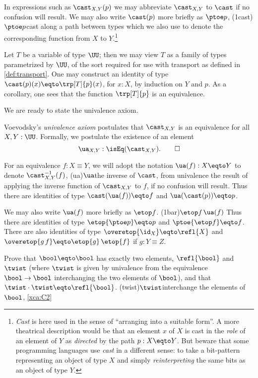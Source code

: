 In expressions such as $\cast_{X,Y}(p)$ we may abbreviate $\cast_{X,Y}$ to $\cast$ if
no confusion will result. We may also write $\cast (p)$ more briefly as $\ptoe p$,%
\glossary(1cast){$\protect\ptoe p$}{cast along a path between types}
which we also use to denote the corresponding function from $X$ to $Y$.\footnote{%
    \emph{Cast} is here used in the sense of ``arranging into a suitable form''.
    A more theatrical description would be that an element $x$ of $X$ is cast in the \emph{role} of an element of $Y$
    as \emph{directed} by the path $p : X \eqto Y$.
    But beware that some programming languages use \emph{cast} in a different sense:
    to take a bit-pattern representing an object of type $X$ and simply \emph{reinterpreting} the same bits as an object of type $Y$.}

Let $T$ be a variable of type $\UU$; then we may view $T$ as a family of types parametrized by $\UU$, of the sort required for use with
transport as defined in \cref{def:transport}.  One may construct an identity of type $\cast(p)(x) \eqto \trp[T]{p} (x)$, for $x : X$, by induction
on $Y$ and $p$.  As a corollary, one sees that the function $\trp[T]{p}$ is an equivalence.

We are ready to state the univalence axiom.

\begin{principle}\label{def:univalence}
    Voevodsky's \emph{univalence axiom} postulates that $\cast_{X,Y}$ is an equivalence for all $X,Y:\UU$.
    Formally, we postulate the existence of an element
    \[
      \ua_{X,Y} : \isEq(\cast_{X,Y}).\qedhere
    \]
\end{principle}

For an equivalence $f: X\equiv Y$, we will adopt the notation $\ua(f) : X \eqto Y $ to denote $\cast_{X,Y}^{-1}(f)$,%
\glossary(ua){$\protect\ua$}{the inverse of $\protect\cast$, from univalence}
the result of applying the
inverse function of $\cast_{X,Y}$ to $f$, if no confusion will result.  Thus there are identities of type $\cast (\ua (f)) \eqto f$ and $\ua (\cast (p)) \eqto p$.

We may also write $\ua (f)$ more briefly as $\etop f$.%
\glossary(1bar){$\protect\etop f$}{$\protect\ua(f)$}
Thus there are identities of type $\etop {\ptoe p} \eqto p$ and $\ptoe {\etop f} \eqto f$.  There are also identities of type $\overetop{\id_X} \eqto \refl{X}$
and $\overetop{g\,f} \eqto \etop{g}\,\etop{f}$ if $g: Y\equiv Z$.

\begin{xca}\label{xca:C2}
Prove that $\bool \eqto \bool$ has exactly two elements,
$\refl{\bool}$ and $\twist$ (where $\twist$ is given by
univalence from the equivalence $\bool\to\bool$ interchanging
the two elements of $\bool$), and that $\twist\cdot\twist \eqto \refl{\bool}$.%
\glossary(twist){$\protect\twist$}{interchange the elements of $\bool$,
  \cref{xca:C2}}
\end{xca}


